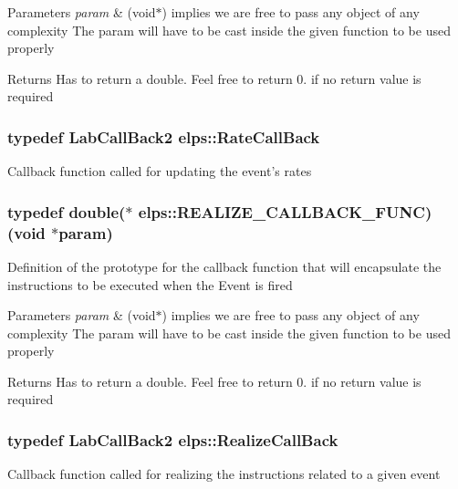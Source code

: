 \begin{DoxyParams}{Parameters}
{\em param} & (void$\ast$) implies we are free to pass any object of any complexity The param will have to be cast inside the given function to be used properly \\
\hline
\end{DoxyParams}
\begin{DoxyReturn}{Returns}
Has to return a double. Feel free to return 0. if no return value is required 
\end{DoxyReturn}
\hypertarget{namespaceelps_a121bfb217e5fbb734b95d3f7b6653fb2}{
\subsubsection[{Rate\+Call\+Back}]{\setlength{\rightskip}{0pt plus 5cm}typedef {\bf Lab\+Call\+Back2} {\bf elps\+::\+Rate\+Call\+Back}}}\label{namespaceelps_a121bfb217e5fbb734b95d3f7b6653fb2}
Callback function called for updating the event's rates \hypertarget{namespaceelps_a3f8f7ce6643b1498f3ae0f6b09c2f1fc}{
\subsubsection[{R\+E\+A\+L\+I\+Z\+E\+\_\+\+C\+A\+L\+L\+B\+A\+C\+K\+\_\+\+F\+U\+N\+C}]{\setlength{\rightskip}{0pt plus 5cm}typedef double($\ast$ elps\+::\+R\+E\+A\+L\+I\+Z\+E\+\_\+\+C\+A\+L\+L\+B\+A\+C\+K\+\_\+\+F\+U\+N\+C)(void $\ast$param)}}\label{namespaceelps_a3f8f7ce6643b1498f3ae0f6b09c2f1fc}
Definition of the prototype for the callback function that will encapsulate the instructions to be executed when the Event is fired


\begin{DoxyParams}{Parameters}
{\em param} & (void$\ast$) implies we are free to pass any object of any complexity The param will have to be cast inside the given function to be used properly \\
\hline
\end{DoxyParams}
\begin{DoxyReturn}{Returns}
Has to return a double. Feel free to return 0. if no return value is required 
\end{DoxyReturn}
\hypertarget{namespaceelps_adb49d5dbf827d9b190d0b1fd15e0193c}{
\subsubsection[{Realize\+Call\+Back}]{\setlength{\rightskip}{0pt plus 5cm}typedef {\bf Lab\+Call\+Back2} {\bf elps\+::\+Realize\+Call\+Back}}}\label{namespaceelps_adb49d5dbf827d9b190d0b1fd15e0193c}
Callback function called for realizing the instructions related to a given event 

